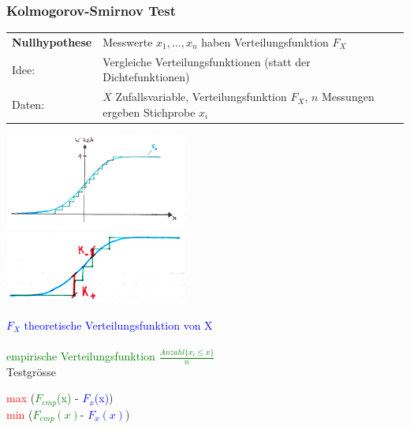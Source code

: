   	
	\subsubsection{Kolmogorov-Smirnov Test}
	\begin{tabular}{ll}
	\textbf{Nullhypothese} & Messwerte $x_1, ..., x_n$ haben Verteilungsfunktion $F_X$\\
    Idee: & Vergleiche Verteilungsfunktionen (statt der Dichtefunktionen)\\
    Daten: & $X$ Zufallsvariable, Verteilungsfunktion $F_X$, $n$ Messungen
    ergeben Stichprobe $x_i$
    \end{tabular}

	\begin{minipage}{6cm}
    \includegraphics[width=6cm]{./bilder/ks1.png}\\
    \includegraphics[width=6cm]{./bilder/ks2.png}\\
    \end{minipage}
	\begin{minipage}{12cm}
    \textcolor{blue}{$F_X$ theoretische Verteilungsfunktion von X}\\ \\
    \vspace{15mm}
    \textcolor{green}{empirische Verteilungsfunktion $\frac{Anzahl\{x_i \leq
    x \}}{n}$}\\

    Testgrösse\\
    \hspace*{0.5cm}
    	\parbox{6cm}{\textcolor{red}{max}
   			(\textcolor{green}{$F_{emp}$(x)} - 
   			\textcolor{blue}{$F_x$(x)})\\
    		\textcolor{red}{min} 
    		(\textcolor{green}{$F_{emp}(x)$}-
    		\textcolor{blue}{$F_x(x)$})}

    \end{minipage}

